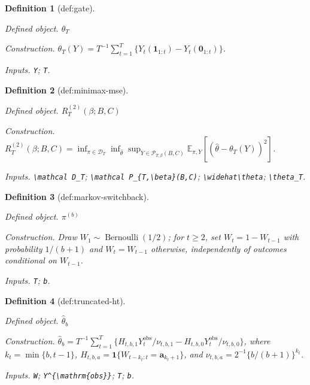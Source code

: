 \documentclass{article}
\newtheorem{definition}{Definition}
\begin{document}
\begin{definition}[def:gate]\label{def:gate}
\par\smallskip\noindent\emph{Defined object.} \(\theta_T\)
\par\smallskip\noindent\emph{Construction.} \(\theta_T(Y)=T^{-1}\sum_{t=1}^T\{Y_t(\mathbf 1_{1:t})-Y_t(\mathbf 0_{1:t})\}\).
\par\smallskip\noindent\emph{Inputs.} \texttt{Y}; \texttt{T}.
\end{definition}

\begin{definition}[def:minimax-mse]\label{def:minimax-mse}
\par\smallskip\noindent\emph{Defined object.} \(R_T^{(2)}(\beta;B,C)\)
\par\smallskip\noindent\emph{Construction.} \(R_T^{(2)}(\beta;B,C)=\inf_{\pi\in\mathcal D_T}\inf_{\widehat\theta}\sup_{Y\in\mathcal P_{T,\beta}(B,C)}\mathbb E_{\pi,Y}[(\widehat\theta-\theta_T(Y))^2]\).
\par\smallskip\noindent\emph{Inputs.} \texttt{\textbackslash{}\allowbreak{}mathcal D\_\allowbreak{}T}; \texttt{\textbackslash{}\allowbreak{}mathcal P\_\allowbreak{}\{T,\allowbreak{}\textbackslash{}\allowbreak{}beta\}\allowbreak{}(B,\allowbreak{}C)}; \texttt{\textbackslash{}\allowbreak{}widehat\textbackslash{}\allowbreak{}theta}; \texttt{\textbackslash{}\allowbreak{}theta\_\allowbreak{}T}.
\end{definition}

\begin{definition}[def:markov-switchback]\label{def:markov-switchback}
\par\smallskip\noindent\emph{Defined object.} \(\pi^{(b)}\)
\par\smallskip\noindent\emph{Construction.} Draw \(W_1\sim\operatorname{Bernoulli}(1/2)\); for \(t\ge2\), set \(W_t=1-W_{t-1}\) with probability \(1/(b+1)\) and \(W_t=W_{t-1}\) otherwise, independently of outcomes conditional on \(W_{t-1}\).
\par\smallskip\noindent\emph{Inputs.} \texttt{T}; \texttt{b}.
\end{definition}

\begin{definition}[def:truncated-ht]\label{def:truncated-ht}
\par\smallskip\noindent\emph{Defined object.} \(\widehat\theta_b\)
\par\smallskip\noindent\emph{Construction.} \(\widehat\theta_b=T^{-1}\sum_{t=1}^T\{H_{t,b,1}Y_t^{\mathrm{obs}}/\nu_{t,b,1}-H_{t,b,0}Y_t^{\mathrm{obs}}/\nu_{t,b,0}\}\), where \(k_t=\min\{b,t-1\}\), \(H_{t,b,a}=\mathbf 1\{W_{t-k_t:t}=\mathbf a_{k_t+1}\}\), and \(\nu_{t,b,a}=2^{-1}\{b/(b+1)\}^{k_t}\).
\par\smallskip\noindent\emph{Inputs.} \texttt{W}; \texttt{Y\textasciicircum{}\{\textbackslash{}\allowbreak{}mathrm\{obs\}\allowbreak{}\}\allowbreak{}}; \texttt{T}; \texttt{b}.
\end{definition}
\end{document}
